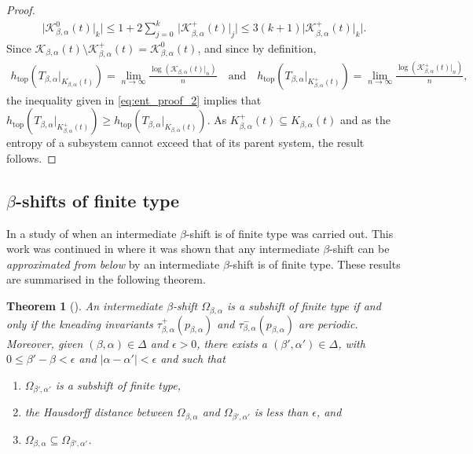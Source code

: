 \documentclass[a4paper,reqno,10pt]{amsart}
\newtheorem{theorem}{Theorem}[section]
\begin{document}
\begin{proof}
    \begin{align}\label{eq:ent_proof_2}
        \lvert \mathcal{K}_{\beta,\alpha}^{0}(t)\vert_{k} \rvert 
        \leq 1 + 2 \sum_{j = 0}^{k} \, \lvert \mathcal{K}_{\beta,\alpha}^{+}(t)\vert_{j} \rvert
        \leq 3 (k+1) \lvert \mathcal{K}_{\beta,\alpha}^{+}(t)\vert_{k} \rvert.
    \end{align}
Since $\mathcal{K}_{\beta,\alpha}(t)\setminus \mathcal{K}_{\beta,\alpha}^{+}(t) = \mathcal{K}_{\beta,\alpha}^{0}(t)$, and since by definition,
    \begin{align*}
        h_{\operatorname{top}}(T_{\beta,\alpha}\vert_{K_{\beta,\alpha}(t)})
        = \lim_{n \to \infty} \frac{\log(\mathcal{K}_{\beta,\alpha}(t)\vert_{n})}{n}
        \quad \text{and} \quad
        h_{\operatorname{top}}(T_{\beta,\alpha}\vert_{K^{+}_{\beta,\alpha}(t)})
        = \lim_{n \to \infty} \frac{\log(\mathcal{K}^{+}_{\beta,\alpha}(t)\vert_{n})}{n},
    \end{align*}
the inequality given in \eqref{eq:ent_proof_2} implies that $h_{\operatorname{top}}(T_{\beta,\alpha}\vert_{K^{+}_{\beta,\alpha}(t)}) \geq h_{\operatorname{top}}(T_{\beta,\alpha}\vert_{K_{\beta,\alpha}(t)})$. As $K^{+}_{\beta,\alpha}(t) \subseteq K_{\beta,\alpha}(t)$ and as the entropy of a subsystem cannot exceed that of its parent system, the result follows.
\end{proof}

%
%
%
\subsection{\texorpdfstring{$\beta$}{beta}-shifts of finite type}
%
%
%

In \cite{LSS16} a study of when an intermediate $\beta$-shift is of finite type was carried out. This work was continued in \cite{LSSS} where it was shown that any intermediate $\beta$-shift can be \textsl{approximated from below} by an intermediate $\beta$-shift is of finite type.  These results are summarised in the following theorem.

\begin{theorem}[{\cite{LSSS,LSS16}}]\label{thm:LSSS}
An intermediate $\beta$-shift $\Omega_{\beta,\alpha}$ is a subshift of finite type if and only if the kneading invariants $\tau_{\beta,\alpha}^{+}(p_{\beta,\alpha})$ and $\tau_{\beta,\alpha}^{-}(p_{\beta,\alpha})$ are periodic.  Moreover, given $(\beta, \alpha) \in \Delta$ and $\epsilon > 0$, there exists a $(\beta', \alpha') \in \Delta$, with $0 \leq \beta' - \beta < \epsilon$ and $\lvert \alpha - \alpha' \rvert < \epsilon$ and such that 
    \begin{enumerate}[label={\rm(\arabic*)}]
    \item $\Omega_{\beta', \alpha'}$ is a subshift of finite type,
    \item the Hausdorff distance between $\Omega_{\beta, \alpha}$ and $\Omega_{\beta', \alpha'}$ is less than $\epsilon$, and 
    \item $\Omega_{\beta, \alpha} \subseteq \Omega_{\beta', \alpha'}$.
    \end{enumerate}
\end{theorem}
\end{document}
